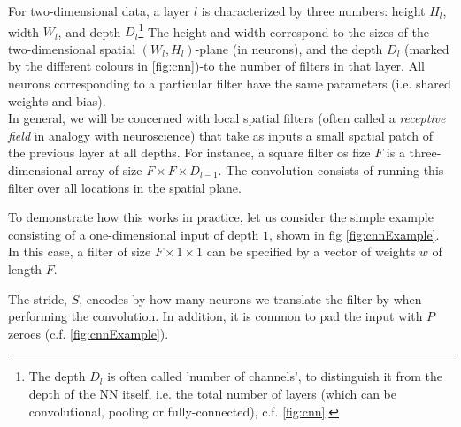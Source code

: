 For two-dimensional data, a layer $l$ is characterized by three numbers: height $H_l$, width $W_l$, and depth $D_l$\footnote{The depth $D_l$ is often called ’number of channels’, to distinguish it from the depth of the NN itself, i.e. the total number of layers (which can be convolutional, pooling or fully-connected), c.f. \ref{fig:cnn}.}
 The height and width correspond to the sizes of the two-dimensional spatial $(W_l, H_l)$-plane (in neurons), and the depth $D_l$ (marked by the different colours in \ref{fig:cnn})-to the number of filters in that layer. All neurons corresponding to a particular filter have the same parameters (i.e. shared weights and bias).\\
 In general, we will be concerned with local spatial filters (often called a \emph{receptive field} in analogy with neuroscience) that take as inputs a small spatial patch of the previous layer at all depths. For instance, a square filter os fize $F$ is a three-dimensional array of size $F\times F\times D_{l-1}$. The convolution consists of running this filter over all locations in the spatial plane.
 \begin{example}
 	To demonstrate how this works in practice, let us consider the simple example consisting of a one-dimensional input of depth $1$, shown in fig \ref{fig:cnnExample}. In this case, a filter of size $F\times 1\times 1$ can be specified by a vector of weights $w$ of length $F$. 
 \end{example}
The stride, $S$, encodes by how many neurons we translate the filter by when performing the convolution. In addition, it is common to pad the input with $P$ zeroes (c.f. \ref{fig:cnnExample}).

